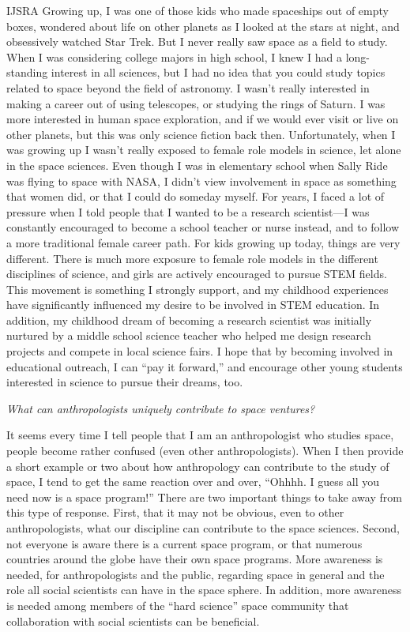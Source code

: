 \begin{labeling}{IJSRA}
	Growing up, I was one of those kids who made spaceships out of empty boxes, wondered about life on other planets as I looked at the stars at night, and obsessively watched Star Trek. But I never really saw space as a field to study. When I was considering college majors in high school, I knew I had a long-standing interest in all sciences, but I had no idea that you could study topics related to space beyond the field of astronomy. I wasn’t really interested in making a career out of using telescopes, or studying the rings of Saturn. I was more interested in human space exploration, and if we would ever visit or live on other planets, but this was only science fiction back then. Unfortunately, when I was growing up I wasn’t really exposed to female role models in science, let alone in the space sciences. Even though I was in elementary school when Sally Ride was flying to space with NASA, I didn’t view involvement in space as something that women did, or that I could do someday myself. For years, I faced a lot of pressure when I told people that I wanted to be a research scientist—I was constantly encouraged to become a school teacher or nurse instead, and to follow a more traditional female career path. For kids growing up today, things are very different. There is much more exposure to female role models in the different disciplines of science, and girls are actively encouraged to pursue STEM fields. This movement is something I strongly support, and my childhood experiences have significantly influenced my desire to be involved in STEM education. In addition, my childhood dream of becoming a research scientist was initially nurtured by a middle school science teacher who helped me design research projects and compete in local science fairs. I hope that by becoming involved in educational outreach, I can “pay it forward,” and encourage other young students interested in science to pursue their dreams, too.

	\item[IJSRA] \emph{What can anthropologists uniquely contribute to space ventures?}

	\item[KS] It seems every time I tell people that I am an anthropologist who studies space, people become rather confused (even other anthropologists). When I then provide a short example or two about how anthropology can contribute to the study of space, I tend to get the same reaction over and over, “Ohhhh. I guess all you need now is a space program!” There are two important things to take away from this type of response. First, that it may not be obvious, even to other anthropologists, what our discipline can contribute to the space sciences. Second, not everyone is aware there is a current space program, or that numerous countries around the globe have their own space programs. More awareness is needed, for anthropologists and the public, regarding space in general and the role all social scientists can have in the space sphere. In addition, more awareness is needed among members of the “hard science” space community that collaboration with social scientists can be beneficial.


\end{labeling}
